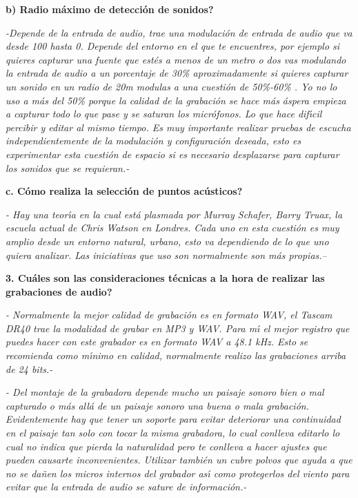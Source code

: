 \textbf{b) \textquestiondown Radio m\'{a}ximo de detecci\'{o}n de sonidos?}

\textit{-Depende de la entrada de audio, trae una modulaci\'{o}n de entrada de
audio que va desde 100 hasta 0. Depende del entorno en el que te encuentres,
por ejemplo si quieres capturar una fuente que est\'{e}s a menos de un metro o
dos vas modulando la entrada de audio a un porcentaje de 30\% aproximadamente
si quieres capturar un sonido en un radio de 20m modulas a una cuesti\'{o}n de
50\%-60\% . Yo no lo uso a m\'{a}s del 50\% porque la calidad de la
grabaci\'{o}n se hace m\'{a}s \'{a}spera empieza a capturar todo lo que pase y
se saturan los micr\'{o}fonos. Lo que hace dif\'{\i}cil percibir y editar al
mismo tiempo. Es muy importante realizar pruebas de escucha independientemente
de la modulaci\'{o}n y configuraci\'{o}n deseada, esto es experimentar esta
cuesti\'{o}n de espacio si es necesario desplazarse para capturar los sonidos
que se requieran.-}

\textbf{c. \textquestiondown C\'{o}mo realiza la selecci\'{o}n de puntos
ac\'{u}sticos? }

\textit{- Hay una teor\'{\i}a en la cual est\'{a} plasmada por Murray Schafer,
Barry Truax, la escuela actual de Chris Watson en Londres. Cada uno en esta
cuesti\'{o}n es muy amplio desde un entorno natural, urbano, esto va
dependiendo de lo que uno quiera analizar. Las iniciativas que uso son
normalmente son m\'{a}s propias.-- }

\textbf{3. \textquestiondown Cu\'{a}les son las consideraciones t\'{e}cnicas a
la hora de realizar las grabaciones de audio? }

\qquad\textit{- Normalmente la mejor calidad de grabaci\'{o}n es en formato
WAV, el Tascam DR40 trae la modalidad de grabar en MP3 y WAV. Para m\'{\i} el
mejor registro que puedes hacer con este grabador es en formato WAV a 48.1
kHz. Esto se recomienda como m\'{\i}nimo en calidad, normalmente realizo las
grabaciones arriba de 24 bits.- }

\textit{- Del montaje de la grabadora depende mucho un paisaje sonoro bien o
mal capturado o m\'{a}s all\'{a} de un paisaje sonoro una buena o mala
grabaci\'{o}n. Evidentemente hay que tener un soporte para evitar deteriorar
una continuidad en el paisaje tan solo con tocar la misma grabadora, lo cual
conlleva editarlo lo cual no indica que pierda la naturalidad pero te conlleva
a hacer ajustes que pueden causarte inconvenientes. Utilizar tambi\'{e}n un
cubre polvos que ayuda a que no se da\~{n}en los micros internos del grabador
as\'{\i} como protegerlos del viento para evitar que la entrada de audio se
sature de informaci\'{o}n.-}

